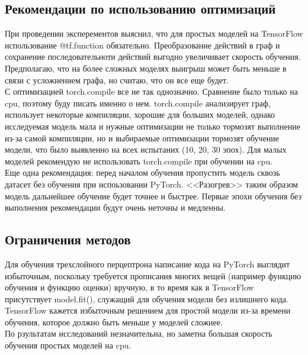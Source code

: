 \documentclass[a4paper,12pt,titlepage,final]{article}
\begin{document}
\begin{center}
    \item \subsection{Рекомендации по использованию оптимизаций}
\end{center}

При проведении эксперементов выяснил, что для простых моделей на TensorFlow использование @tf.function обязательно. Преобразование действий в граф и сохранение последовательноти действий выгодно увеличивает скорость обучения. Предполагаю, что на более сложных моделях выигрыш может быть меньше в связи с усложнением графа, но считаю, что он все еще будет.\\

С оптимизацией torch.compile все не так однозначно. Сравнение было только на cpu, поэтому буду писать именно о нем. torch.compile анализирует граф, использует некоторые компиляции, хорошие для больших моделей, однако исследуемая модель мала и нужные оптимизации не только тормозят выполнение из-за самой компиляции, но и выбираемые оптимизации тормозят обучение модели, что было выявленно на всех испытаних (10, 20, 30 эпох). Для малых моделей рекомендую не использовать torch.compile при обучении на cpu.\\

Еще одна рекомендация: перед началом обучения пропустить модель сквозь датасет без обучения при испоьзовании PyTorch. <<Разогрев>> таким образом модель дальнейшее обучение будет точнее и быстрее. Первые эпохи обучения без выполнения рекомендации будут очень неточны и медленны.

\begin{center}
    \item \subsection{Ограничения методов}
\end{center}

Для обучения трехслойного перцептрона написание кода на PyTorch выглядит избыточным, поскольку требуется прописания многих вещей (например функцию обучения и функцию оценки) вручную, в то время как в TensorFlow присутствует model.fit(), служащий для обучения модели без излишнего кода.\\


TensorFlow кажется избыточным решением для простой модели из-за времени обучения, которое должно быть меньше у моделей сложнее.\\

По рзультатам исследований незначительна, но заметна большая скорость обучения простых моделей на cpu.\\
\end{document}
